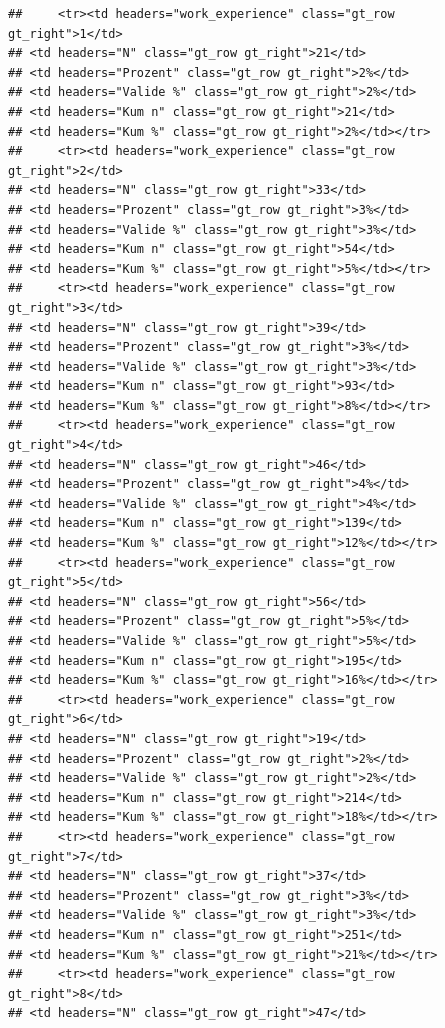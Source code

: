 \documentclass[
  a4paper,
  DIV=11,
  numbers=noendperiod]{scrartcl}
\begin{document}
\begin{verbatim}
##     <tr><td headers="work_experience" class="gt_row gt_right">1</td>
## <td headers="N" class="gt_row gt_right">21</td>
## <td headers="Prozent" class="gt_row gt_right">2%</td>
## <td headers="Valide %" class="gt_row gt_right">2%</td>
## <td headers="Kum n" class="gt_row gt_right">21</td>
## <td headers="Kum %" class="gt_row gt_right">2%</td></tr>
##     <tr><td headers="work_experience" class="gt_row gt_right">2</td>
## <td headers="N" class="gt_row gt_right">33</td>
## <td headers="Prozent" class="gt_row gt_right">3%</td>
## <td headers="Valide %" class="gt_row gt_right">3%</td>
## <td headers="Kum n" class="gt_row gt_right">54</td>
## <td headers="Kum %" class="gt_row gt_right">5%</td></tr>
##     <tr><td headers="work_experience" class="gt_row gt_right">3</td>
## <td headers="N" class="gt_row gt_right">39</td>
## <td headers="Prozent" class="gt_row gt_right">3%</td>
## <td headers="Valide %" class="gt_row gt_right">3%</td>
## <td headers="Kum n" class="gt_row gt_right">93</td>
## <td headers="Kum %" class="gt_row gt_right">8%</td></tr>
##     <tr><td headers="work_experience" class="gt_row gt_right">4</td>
## <td headers="N" class="gt_row gt_right">46</td>
## <td headers="Prozent" class="gt_row gt_right">4%</td>
## <td headers="Valide %" class="gt_row gt_right">4%</td>
## <td headers="Kum n" class="gt_row gt_right">139</td>
## <td headers="Kum %" class="gt_row gt_right">12%</td></tr>
##     <tr><td headers="work_experience" class="gt_row gt_right">5</td>
## <td headers="N" class="gt_row gt_right">56</td>
## <td headers="Prozent" class="gt_row gt_right">5%</td>
## <td headers="Valide %" class="gt_row gt_right">5%</td>
## <td headers="Kum n" class="gt_row gt_right">195</td>
## <td headers="Kum %" class="gt_row gt_right">16%</td></tr>
##     <tr><td headers="work_experience" class="gt_row gt_right">6</td>
## <td headers="N" class="gt_row gt_right">19</td>
## <td headers="Prozent" class="gt_row gt_right">2%</td>
## <td headers="Valide %" class="gt_row gt_right">2%</td>
## <td headers="Kum n" class="gt_row gt_right">214</td>
## <td headers="Kum %" class="gt_row gt_right">18%</td></tr>
##     <tr><td headers="work_experience" class="gt_row gt_right">7</td>
## <td headers="N" class="gt_row gt_right">37</td>
## <td headers="Prozent" class="gt_row gt_right">3%</td>
## <td headers="Valide %" class="gt_row gt_right">3%</td>
## <td headers="Kum n" class="gt_row gt_right">251</td>
## <td headers="Kum %" class="gt_row gt_right">21%</td></tr>
##     <tr><td headers="work_experience" class="gt_row gt_right">8</td>
## <td headers="N" class="gt_row gt_right">47</td>

\end{verbatim}
\end{document}
